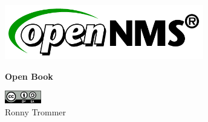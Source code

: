 %
%
%
%

\begin{titlepage}
    \begin{center}
        \includegraphics[width=0.65\textwidth]{images/opennms-logo.png}
    \end{center}
    \vspace{8em}
    \center
    \Huge{\textbf{Open Book}}
    \vspace{15em}

    \begin{flushright}
        \includegraphics[width=0.12\textwidth]{images/by-sa.png}
        \\
        \tiny{Ronny Trommer}
    \end{flushright}
\end{titlepage}